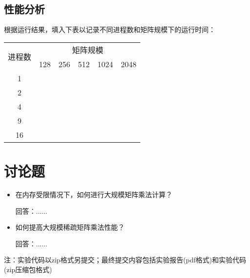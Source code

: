 \documentclass{SYSUReport}
\begin{document}
\subsection{性能分析}
根据运行结果，填入下表以记录不同进程数和矩阵规模下的运行时间：
\begin{table}[htpb]
\centering
\begin{tabular}{|c|lllll|}
\hline
\multirow{2}{*}{进程数} & \multicolumn{5}{c|}{矩阵规模}                                                                        \\ \cline{2-6} 
 & \multicolumn{1}{l|}{128} & \multicolumn{1}{l|}{256} & \multicolumn{1}{l|}{512} & \multicolumn{1}{l|}{1024} & 2048 \\ \hline
1                    & \multicolumn{1}{l|}{} & \multicolumn{1}{l|}{} & \multicolumn{1}{l|}{} & \multicolumn{1}{l|}{} &  \\ \hline
2                    & \multicolumn{1}{l|}{} & \multicolumn{1}{l|}{} & \multicolumn{1}{l|}{} & \multicolumn{1}{l|}{} &  \\ \hline
4                    & \multicolumn{1}{l|}{} & \multicolumn{1}{l|}{} & \multicolumn{1}{l|}{} & \multicolumn{1}{l|}{} &  \\ \hline
9                    & \multicolumn{1}{l|}{} & \multicolumn{1}{l|}{} & \multicolumn{1}{l|}{} & \multicolumn{1}{l|}{} &  \\ \hline
16                   & \multicolumn{1}{l|}{} & \multicolumn{1}{l|}{} & \multicolumn{1}{l|}{} & \multicolumn{1}{l|}{} &  \\ \hline
\end{tabular}
\end{table}
\section{讨论题}
\begin{itemize}
    \item 在内存受限情况下，如何进行大规模矩阵乘法计算？

    回答：......
    \item 如何提高大规模稀疏矩阵乘法性能？

    回答：......
\end{itemize}
注：实验代码以zip格式另提交；最终提交内容包括实验报告(pdf格式)和实验代码(zip压缩包格式)
\end{document}
